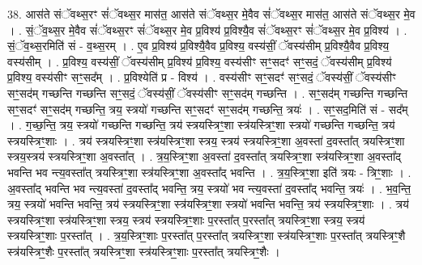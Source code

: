 \documentclass[17pt]{extarticle}
\begin{document}
38. आस॑ते संॅवथ्स॒रꣳ सं॑ॅवथ्स॒र मास॑त॒ आस॑ते संॅवथ्स॒र मे॒वैव सं॑ॅवथ्स॒र मास॑त॒ आस॑ते संॅवथ्स॒र मे॒व । . सं॒ॅव॒थ्स॒र मे॒वैव सं॑ॅवथ्स॒रꣳ सं॑ॅवथ्स॒र मे॒व प्र॒विश्य॑ प्र॒विश्यै॒व सं॑ॅवथ्स॒रꣳ सं॑ॅवथ्स॒र मे॒व प्र॒विश्य॑ । . सं॒ॅव॒थ्स॒रमिति॑ सं - व॒थ्स॒रम् । . ए॒व प्र॒विश्य॑ प्र॒विश्यै॒वैव प्र॒विश्य॒ वस्य॑सीं॒ ॅवस्य॑सीम् प्र॒विश्यै॒वैव प्र॒विश्य॒ वस्य॑सीम् । . प्र॒विश्य॒ वस्य॑सीं॒ ॅवस्य॑सीम् प्र॒विश्य॑ प्र॒विश्य॒ वस्य॑सीꣳ सꣳ॒॒सदꣳ॑ सꣳ॒॒सदं॒ ॅवस्य॑सीम् प्र॒विश्य॑ प्र॒विश्य॒ वस्य॑सीꣳ सꣳ॒॒सद᳚म् । . प्र॒विश्येति॑ प्र - विश्य॑ । . वस्य॑सीꣳ सꣳ॒॒सदꣳ॑ सꣳ॒॒सदं॒ ॅवस्य॑सीं॒ ॅवस्य॑सीꣳ सꣳ॒॒सद॑म् गच्छन्ति गच्छन्ति सꣳ॒॒सदं॒ ॅवस्य॑सीं॒ ॅवस्य॑सीꣳ सꣳ॒॒सद॑म् गच्छन्ति । . सꣳ॒॒सद॑म् गच्छन्ति गच्छन्ति सꣳ॒॒सदꣳ॑ सꣳ॒॒सद॑म् गच्छन्ति॒ त्रय॒ स्त्रयो॑ गच्छन्ति सꣳ॒॒सदꣳ॑ सꣳ॒॒सद॑म् गच्छन्ति॒ त्रयः॑ । . सꣳ॒॒सद॒मिति॑ सं - सद᳚म् । . ग॒च्छ॒न्ति॒ त्रय॒ स्त्रयो॑ गच्छन्ति गच्छन्ति॒ त्रय॑ स्त्रयस्त्रिꣳ॒॒शा स्त्र॑यस्त्रिꣳ॒॒शा स्त्रयो॑ गच्छन्ति गच्छन्ति॒ त्रय॑ स्त्रयस्त्रिꣳ॒॒शाः । . त्रय॑ स्त्रयस्त्रिꣳ॒॒शा स्त्र॑यस्त्रिꣳ॒॒शा स्त्रय॒ स्त्रय॑ स्त्रयस्त्रिꣳ॒॒शा अ॒वस्ता॑ द॒वस्ता᳚त् त्रयस्त्रिꣳ॒॒शा स्त्रय॒स्त्रय॑ स्त्रयस्त्रिꣳ॒॒शा अ॒वस्ता᳚त् । . त्र॒य॒स्त्रिꣳ॒॒शा अ॒वस्ता॑ द॒वस्ता᳚त् त्रयस्त्रिꣳ॒॒शा स्त्र॑यस्त्रिꣳ॒॒शा अ॒वस्ता᳚द् भवन्ति भव न्त्य॒वस्ता᳚त् त्रयस्त्रिꣳ॒॒शा स्त्र॑यस्त्रिꣳ॒॒शा अ॒वस्ता᳚द् भवन्ति । . त्र॒य॒स्त्रिꣳ॒॒शा इति॑ त्रयः - त्रिꣳ॒॒शाः । . अ॒वस्ता᳚द् भवन्ति भव न्त्य॒वस्ता॑ द॒वस्ता᳚द् भवन्ति॒ त्रय॒ स्त्रयो॑ भव न्त्य॒वस्ता॑ द॒वस्ता᳚द् भवन्ति॒ त्रयः॑ । . भ॒व॒न्ति॒ त्रय॒ स्त्रयो॑ भवन्ति भवन्ति॒ त्रय॑ स्त्रयस्त्रिꣳ॒॒शा स्त्र॑यस्त्रिꣳ॒॒शा स्त्रयो॑ भवन्ति भवन्ति॒ त्रय॑ स्त्रयस्त्रिꣳ॒॒शाः । . त्रय॑ स्त्रयस्त्रिꣳ॒॒शा स्त्र॑यस्त्रिꣳ॒॒शा स्त्रय॒ स्त्रय॑ स्त्रयस्त्रिꣳ॒॒शाः प॒रस्ता᳚त् प॒रस्ता᳚त् त्रयस्त्रिꣳ॒॒शा स्त्रय॒ स्त्रय॑ स्त्रयस्त्रिꣳ॒॒शाः प॒रस्ता᳚त् । . त्र॒य॒स्त्रिꣳ॒॒शाः प॒रस्ता᳚त् प॒रस्ता᳚त् त्रयस्त्रिꣳ॒॒शा स्त्र॑यस्त्रिꣳ॒॒शाः प॒रस्ता᳚त् त्रयस्त्रिꣳ॒॒शै स्त्र॑यस्त्रिꣳ॒॒शैः प॒रस्ता᳚त् त्रयस्त्रिꣳ॒॒शा स्त्र॑यस्त्रिꣳ॒॒शाः प॒रस्ता᳚त् त्रयस्त्रिꣳ॒॒शैः । \newline
\end{document}
